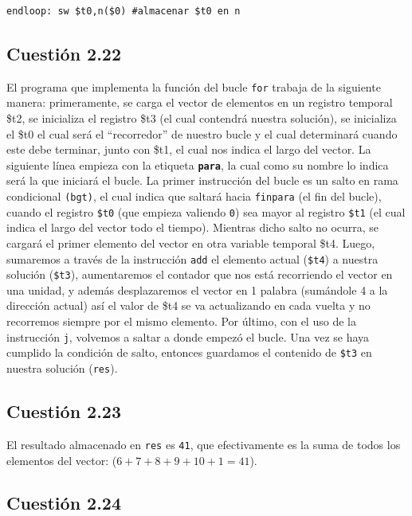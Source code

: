 \documentclass[11pt]{article}
\begin{document}
\begin{large}
\begin{flushleft}
\begin{listing}[h]
\begin{verbatim}
endloop: sw $t0,n($0) #almacenar $t0 en n

\end{verbatim}
\end{listing}

\subsection*{Cuestión 2.22}
El programa que implementa la función del bucle \texttt{for} trabaja de la siguiente manera: primeramente, se carga el vector de elementos en un registro temporal \$t2, se inicializa el registro \$t3 (el cual contendrá nuestra solución), se inicializa el \$t0 el cual será el ``recorredor'' de nuestro bucle y el cual determinará cuando este debe terminar, junto con \$t1, el cual nos indica el largo del vector. La siguiente línea empieza con la etiqueta \textbf{\texttt{para}}, la cual como su nombre lo indica será la que iniciará el bucle. La primer instrucción del bucle es un salto en rama condicional \texttt{(bgt)}, el cual indica que saltará hacia \texttt{finpara} (el fin del bucle), cuando el registro \texttt{\$t0} (que empieza valiendo \texttt{0}) sea mayor al registro \texttt{\$t1} (el cual indica el largo del vector todo el tiempo). Mientras dicho salto no ocurra, se cargará el primer elemento del vector en otra variable temporal \$t4. Luego, sumaremos a través de la instrucción \texttt{add} el elemento actual (\texttt{\$t4}) a nuestra solución (\texttt{\$t3}), aumentaremos el contador que nos está recorriendo el vector en una unidad, y además desplazaremos el vector en 1 palabra (sumándole 4 a la dirección actual) así el valor de \$t4 se va actualizando en cada vuelta y no recorremos siempre por el mismo elemento. Por último, con el uso de la instrucción \texttt{j}, volvemos a saltar a donde empezó el bucle. Una vez se haya cumplido la condición de salto, entonces guardamos el contenido de \texttt{\$t3} en nuestra solución (\texttt{res}).



\subsection*{Cuestión 2.23}
El resultado almacenado en \texttt{res} es \texttt{41}, que efectivamente es la suma de todos los elementos del vector: (\texttt{$6+7+8+9+10+1 = 41$}).


\subsection*{Cuestión 2.24}


\end{flushleft}
\end{large}
\end{document}

